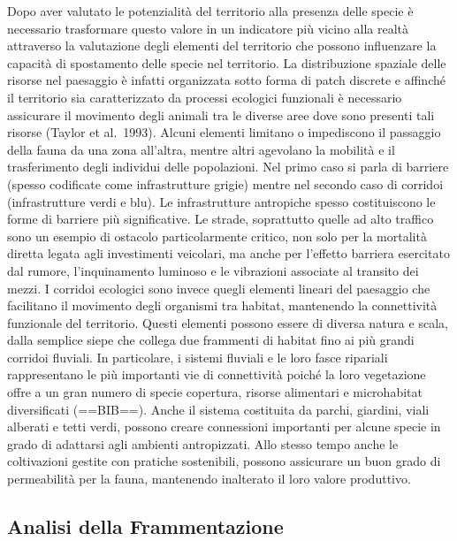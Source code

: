 \documentclass[
]{book}
\begin{document}
Dopo aver valutato le potenzialità del territorio alla presenza delle specie è necessario trasformare questo valore in un indicatore più vicino alla realtà attraverso la valutazione degli elementi del territorio che possono influenzare la capacità di spostamento delle specie nel territorio.
La distribuzione spaziale delle risorse nel paesaggio è infatti organizzata sotto forma di patch discrete e affinché il territorio sia caratterizzato da processi ecologici funzionali è necessario assicurare il movimento degli animali tra le diverse aree dove sono presenti tali risorse (Taylor et al.~1993).
Alcuni elementi limitano o impediscono il passaggio della fauna da una zona all'altra, mentre altri agevolano la mobilità e il trasferimento degli individui delle popolazioni.
Nel primo caso si parla di barriere (spesso codificate come infrastrutture grigie) mentre nel secondo caso di corridoi (infrastrutture verdi e blu).
Le infrastrutture antropiche spesso costituiscono le forme di barriere più significative.
Le strade, soprattutto quelle ad alto traffico sono un esempio di ostacolo particolarmente critico, non solo per la mortalità diretta legata agli investimenti veicolari, ma anche per l'effetto barriera esercitato dal rumore, l'inquinamento luminoso e le vibrazioni associate al transito dei mezzi.
I corridoi ecologici sono invece quegli elementi lineari del paesaggio che facilitano il movimento degli organismi tra habitat, mantenendo la connettività funzionale del territorio.
Questi elementi possono essere di diversa natura e scala, dalla semplice siepe che collega due frammenti di habitat fino ai più grandi corridoi fluviali.
In particolare, i sistemi fluviali e le loro fasce ripariali rappresentano le più importanti vie di connettività poiché la loro vegetazione offre a un gran numero di specie copertura, risorse alimentari e microhabitat diversificati (==BIB==).
Anche il sistema costituita da parchi, giardini, viali alberati e tetti verdi, possono creare connessioni importanti per alcune specie in grado di adattarsi agli ambienti antropizzati.
Allo stesso tempo anche le coltivazioni gestite con pratiche sostenibili, possono assicurare un buon grado di permeabilità per la fauna, mantenendo inalterato il loro valore produttivo.

\subsection{Analisi della Frammentazione}\label{analisi-della-frammentazione}
\end{document}
